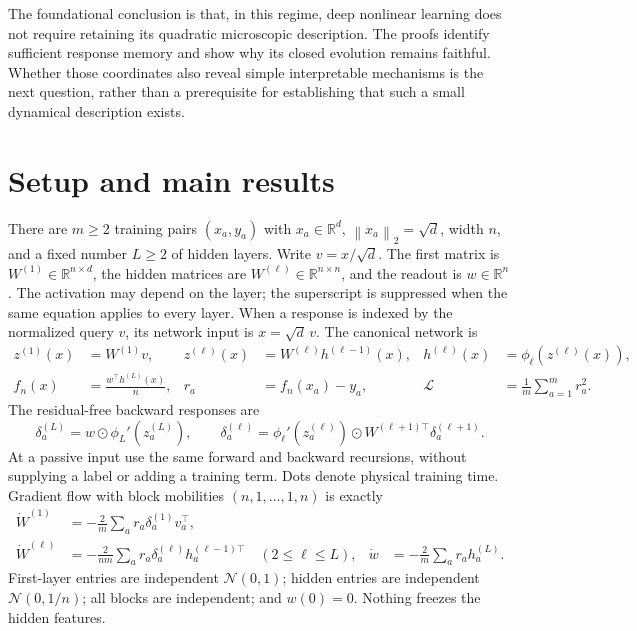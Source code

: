 \documentclass[11pt]{article}
\theoremstyle{definition}
\theoremstyle{remark}
\newcommand{\R}{\mathbb R}
\newcommand{\cL}{\mathcal L}
\newcommand{\norm}[1]{\left\lVert#1\right\rVert}
\newcommand{\od}{\mathbin{\odot}}
\begin{document}
The foundational conclusion is that, in this regime, deep nonlinear learning
does not require retaining its quadratic microscopic description.
The proofs identify sufficient response memory and show why its closed
evolution remains faithful. Whether those coordinates also reveal simple
interpretable mechanisms is the next question, rather than a prerequisite
for establishing that such a small dynamical description exists.

\section{Setup and main results}
\label{cp:setup}

There are $m\ge2$ training pairs $(x_a,y_a)$ with
$x_a\in\R^d$, $\norm{x_a}_2=\sqrt d$, width $n$, and a fixed number
$L\ge2$ of hidden layers. Write $v=x/\sqrt d$. The first matrix is
$W^{(1)}\in\R^{n\times d}$, the hidden matrices are
$W^{(\ell)}\in\R^{n\times n}$, and the readout is $w\in\R^n$.
The activation may depend on the layer; the superscript is suppressed when
the same equation applies to every layer. When a response is indexed by
the normalized query $v$, its network input is $x=\sqrt d\,v$.
The canonical network is
\begin{align}
 z^{(1)}(x)&=W^{(1)}v,&
 z^{(\ell)}(x)&=W^{(\ell)}h^{(\ell-1)}(x),&
 h^{(\ell)}(x)&=\phi_\ell(z^{(\ell)}(x)),\nonumber\\
 f_n(x)&=\frac{w^\top h^{(L)}(x)}n,&
 r_a&=f_n(x_a)-y_a,&
 \cL&=\frac1m\sum_{a=1}^m r_a^2.
 \label{cp:network}
\end{align}
The residual-free backward responses are
\begin{equation}
 \delta_a^{(L)}=w\od\phi_L'(z_a^{(L)}),\qquad
 \delta_a^{(\ell)}=\phi_\ell'(z_a^{(\ell)})\od
                W^{(\ell+1)\top}\delta_a^{(\ell+1)}.
 \label{cp:backward}
\end{equation}
At a passive input use the same forward and backward recursions, without
supplying a label or adding a training term.
Dots denote physical training time. Gradient flow with block mobilities
$(n,1,\ldots,1,n)$ is exactly
\begin{align}
 \dot W^{(1)}&=-\frac2m\sum_a r_a\delta_a^{(1)}v_a^\top,
 \nonumber\\
 \dot W^{(\ell)}&=-\frac2{nm}\sum_a
          r_a\delta_a^{(\ell)}h_a^{(\ell-1)\top}\quad(2\le\ell\le L),
 &\dot w&=-\frac2m\sum_a r_a h_a^{(L)}.
 \label{cp:flow}
\end{align}
First-layer entries are independent $\mathcal N(0,1)$; hidden entries are
independent $\mathcal N(0,1/n)$; all blocks are independent; and $w(0)=0$.
Nothing freezes the hidden features.
\end{document}
